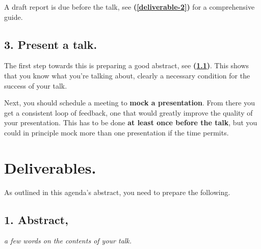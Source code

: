 \documentclass[12pt]{article}
\begin{document}
\noindent
A draft report is due before the talk, see \textbf{(\ref{deliverable-2})} for a comprehensive guide.

\subsection{3. Present a talk.} The first step towards this is preparing a good abstract, see \textbf{(\ref{deliverable-1})}. This shows that you know what you're talking about, clearly a necessary condition for the success of your talk.

\noindent
Next, you should schedule a meeting to \textbf{mock a presentation}. From there you get a consistent loop of feedback, one that would greatly improve the quality of your presentation. This has to be done \textbf{at least once before the talk}, but you could in principle mock more than one presentation if the time permits.

\newpage

\section{Deliverables.} As outlined in this agenda's abstract, you need to prepare the following.

\subsection{1. Abstract,}\label{deliverable-1} \hfill \emph{a few words on the contents of your talk.}\\
\end{document}
